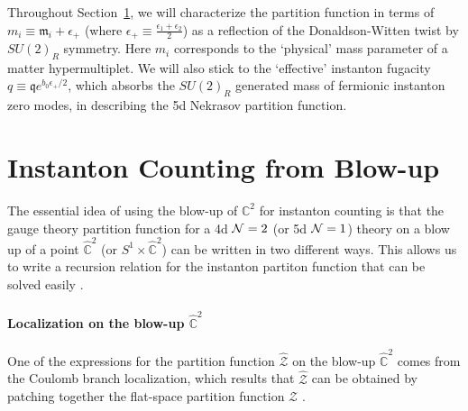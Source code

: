 \documentclass[letterpaper, 11pt]{article}
\def\IC{\mathbb{C}}
\def\CN{{\cal N}}
\begin{document}
Throughout Section~\ref{sec:blowup}, we will characterize the partition function in terms of $m_i \equiv \mathfrak{m}_i + \epsilon_+$ (where $\epsilon_+ \equiv \frac{\epsilon_1 + \epsilon_2}{2}$) as a reflection of the Donaldson-Witten twist by $SU(2)_R$ symmetry. Here $m_i$ corresponds to the `physical' mass parameter of a matter hypermultiplet. We will also stick to the `effective' instanton fugacity $q \equiv \mathfrak{q} e^{{b_0}\epsilon_+/2}$, which absorbs the $SU(2)_R$ generated mass of fermionic instanton zero modes, in describing the 5d Nekrasov partition function.


\section{Instanton Counting from Blow-up} \label{sec:blowup}



The essential idea of using the blow-up of ${\IC}^2$ for instanton counting is that the gauge theory partition function for a 4d $\CN=2$ (or 5d $\CN=1$) theory on a blow up of a point $\hat{\IC}^2$ (or $S^1 \times \hat{\IC}^2$) can be written in two different ways. This allows us to write a recursion relation for the instanton partiton function that can be solved easily \cite{Nakajima:2003pg, Nakajima:2003uh,Nakajima:2005fg, Keller:2012da}. 






\paragraph{Localization on the blow-up $\hat{\IC}^2$}

One of the expressions for the partition function $\hat{\mathcal{Z}}$ on the blow-up $\hat{\IC}^2$ comes from the Coulomb branch localization, which results that $\hat{\mathcal{Z}}$ can be obtained by patching together the flat-space partition function $\mathcal Z$ \cite{Nekrasov:2003vi}.
\end{document}
